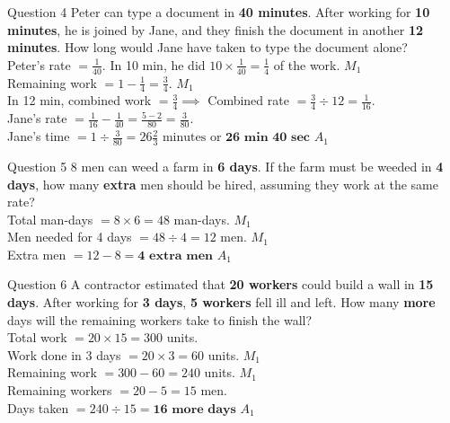 \documentclass[12pt, a4paper, oneside]{article}
\begin{document}
\begin{solvingbox}{Question 4}
Peter can type a document in \textbf{40 minutes}. After working for \textbf{10 minutes}, he is joined by Jane, and they finish the document in another \textbf{12 minutes}. How long would Jane have taken to type the document alone? \\
Peter's rate $= \frac{1}{40}$. In 10 min, he did $10 \times \frac{1}{40} = \frac{1}{4}$ of the work. \hfill $M_1$ \\
Remaining work $= 1 - \frac{1}{4} = \frac{3}{4}$. \hfill $M_1$ \\
In 12 min, combined work $= \frac{3}{4} \implies$ Combined rate $= \frac{3}{4} \div 12 = \frac{1}{16}$. \\
Jane's rate $= \frac{1}{16} - \frac{1}{40} = \frac{5-2}{80} = \frac{3}{80}$. \\
Jane's time $= 1 \div \frac{3}{80} = 26 \frac{2}{3} \text{ minutes or } \mathbf{26\text{ min } 40\text{ sec}}$ \hfill $A_1$
\end{solvingbox}

\begin{solvingbox}{Question 5}
8 men can weed a farm in \textbf{6 days}. If the farm must be weeded in \textbf{4 days}, how many \textbf{extra} men should be hired, assuming they work at the same rate? \\
Total man-days $= 8 \times 6 = 48$ man-days. \hfill $M_1$ \\
Men needed for 4 days $= 48 \div 4 = 12$ men. \hfill $M_1$ \\
Extra men $= 12 - 8 = \mathbf{4\text{ extra men}}$ \hfill $A_1$
\end{solvingbox}

\begin{solvingbox}{Question 6}
A contractor estimated that \textbf{20 workers} could build a wall in \textbf{15 days}. After working for \textbf{3 days}, \textbf{5 workers} fell ill and left. How many \textbf{more} days will the remaining workers take to finish the wall? \\
Total work $= 20 \times 15 = 300$ units. \\
Work done in 3 days $= 20 \times 3 = 60$ units. \hfill $M_1$ \\
Remaining work $= 300 - 60 = 240$ units. \hfill $M_1$ \\
Remaining workers $= 20 - 5 = 15$ men. \\
Days taken $= 240 \div 15 = \mathbf{16\text{ more days}}$ \hfill $A_1$
\end{solvingbox}
\end{document}
